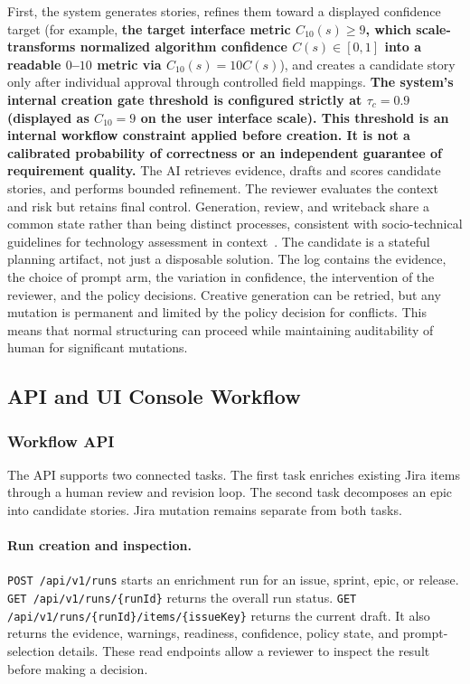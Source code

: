 \documentclass[pdflatex,sn-basic]{sn-jnl}
\begin{document}
First, the system generates stories, refines them toward a displayed confidence target (for example, \textbf{the target interface metric $C_{10}(s) \geq 9$, which scale-transforms normalized algorithm confidence $C(s) \in [0, 1]$ into a readable $0$--$10$ metric via $C_{10}(s) = 10C(s)$}), and creates a candidate story only after individual approval through controlled field mappings. \textbf{The system's internal creation gate threshold is configured strictly at $\tau_c = 0.9$ (displayed as $C_{10} = 9$ on the user interface scale). This threshold is an internal workflow constraint applied before creation. It is not a calibrated probability of correctness or an independent guarantee of requirement quality.} The AI retrieves evidence, drafts and scores candidate stories, and performs bounded refinement. The reviewer evaluates the context and risk but retains final control. Generation, review, and writeback share a common state rather than being distinct processes, consistent with socio-technical guidelines for technology assessment in context~\citep{R71,R58}. The candidate is a stateful planning artifact, not just a disposable solution. The log contains the evidence, the choice of prompt arm, the variation in confidence, the intervention of the reviewer, and the policy decisions. Creative generation can be retried, but any mutation is permanent and limited by the policy decision for conflicts. This means that normal structuring can proceed while maintaining auditability of human for significant mutations.

\FloatBarrier
\subsection{API and UI Console Workflow}\label{sec:workflow-ui}

\subsubsection{Workflow API}
The API supports two connected tasks. The first task enriches existing Jira items through a human review and revision loop. The second task decomposes an epic into candidate stories. Jira mutation remains separate from both tasks.

\paragraph{Run creation and inspection.}
\texttt{POST /api/v1/runs} starts an enrichment run for an issue, sprint, epic, or release. \texttt{GET /api/v1/runs/\allowbreak\{runId\}} returns the overall run status. \texttt{GET /api/v1/runs/\allowbreak\{runId\}/\allowbreak{}items/\allowbreak\{issueKey\}} returns the current draft. It also returns the evidence, warnings, readiness, confidence, policy state, and prompt-selection details. These read endpoints allow a reviewer to inspect the result before making a decision.
\end{document}
